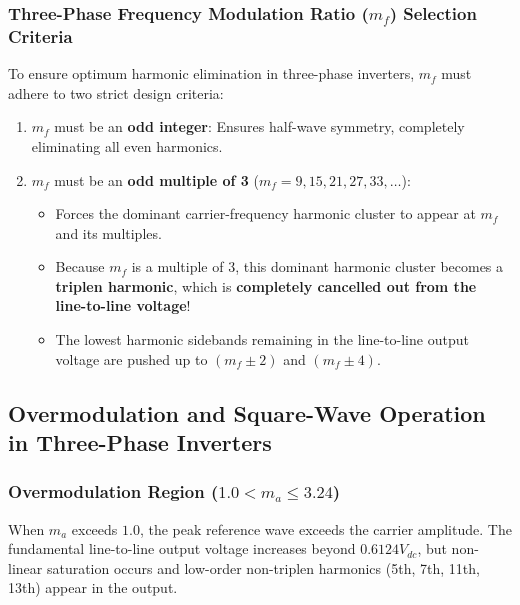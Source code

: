 \documentclass[11pt,a4paper]{article}
\begin{document}
\subsubsection{Three-Phase Frequency Modulation Ratio ($m_f$) Selection Criteria}
To ensure optimum harmonic elimination in three-phase inverters, $m_f$ must adhere to two strict design criteria:
\begin{enumerate}
  \item $m_f$ must be an \textbf{odd integer}: Ensures half-wave symmetry, completely eliminating all even harmonics.
  \item $m_f$ must be an \textbf{odd multiple of 3} ($m_f = 9, 15, 21, 27, 33, \dots$):
  \begin{itemize}
    \item Forces the dominant carrier-frequency harmonic cluster to appear at $m_f$ and its multiples.
    \item Because $m_f$ is a multiple of 3, this dominant harmonic cluster becomes a \textbf{triplen harmonic}, which is \textbf{completely cancelled out from the line-to-line voltage}!
    \item The lowest harmonic sidebands remaining in the line-to-line output voltage are pushed up to $(m_f \pm 2)$ and $(m_f \pm 4)$.
  \end{itemize}
\end{enumerate}

\subsection{Overmodulation and Square-Wave Operation in Three-Phase Inverters}

\subsubsection{Overmodulation Region ($1.0 < m_a \le 3.24$)}
When $m_a$ exceeds $1.0$, the peak reference wave exceeds the carrier amplitude. The fundamental line-to-line output voltage increases beyond $0.6124 V_{dc}$, but non-linear saturation occurs and low-order non-triplen harmonics (5th, 7th, 11th, 13th) appear in the output.
\end{document}

